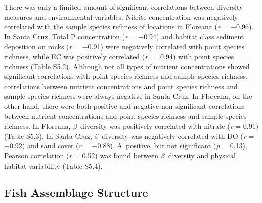 \documentclass[jmse,article,accept,moreauthors,pdftex]{Definitions/mdpi}
\begin{document}
There was only a limited amount of significant correlations between diversity measures and environmental variables. Nitrite concentration was negatively correlated with the sample species richness of locations in Floreana (\textit{r} = $-$0.96). In Santa Cruz, Total P concentration (\textit{r} = $-$0.94) and habitat class sediment deposition on rocks (\textit{r} = $-$0.91) were negatively correlated with point species richness, while EC was positively correlated \mbox{(\textit{r} = 0.94)} with point species richness (Table S5.2). Although not all types of nutrient concentrations showed significant correlations with point species richness and sample species richness, correlations between nutrient concentrations and point species richness and sample species richness were always negative in Santa Cruz. In Floreana, on the other hand, there were both positive and negative non-significant correlations between nutrient concentrations and point species richness and sample species richness. In Floreana, $\beta$~diversity was positively correlated with nitrate (\textit{r} = 0.91) (Table S5.3). In Santa Cruz, $\beta$~diversity was negatively correlated with DO (\textit{r} = $-$0.92) and sand cover (\textit{r} = $-$0.88). A~positive, but not significant (\textit{p} = 0.13), Pearson correlation (\textit{r} = 0.52) was found between $\beta$~diversity and physical habitat variability (Table S5.4). 

\FloatBarrier

\subsection{Fish Assemblage Structure}
\label{Fishassemblagestructure}
\end{document}
